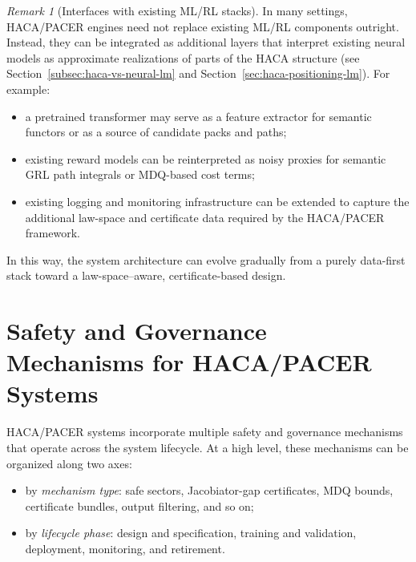 \documentclass[11pt]{book}
\theoremstyle{plain}
\theoremstyle{definition}
\theoremstyle{remark}
\newtheorem{remark}[theorem]{Remark}
\begin{document}
\begin{remark}[Interfaces with existing ML/RL stacks]
\label{rem:interfaces-ml-rl-stacks}
In many settings, HACA/PACER engines need not replace existing ML/RL
components outright. Instead, they can be integrated as additional
layers that interpret existing neural models as approximate realizations
of parts of the HACA structure (see
Section~\ref{subsec:haca-vs-neural-lm} and
Section~\ref{sec:haca-positioning-lm}). For example:
\begin{itemize}
  \item a pretrained transformer may serve as a feature extractor for
        semantic functors or as a source of candidate packs and paths;
  \item existing reward models can be reinterpreted as noisy proxies
        for semantic GRL path integrals or MDQ-based cost terms;
  \item existing logging and monitoring infrastructure can be extended
        to capture the additional law-space and certificate data
        required by the HACA/PACER framework.
\end{itemize}
In this way, the system architecture can evolve gradually from a purely
data-first stack toward a law-space–aware, certificate-based design.
\end{remark}



\section[Safety and Governance Mechanisms for HACA/PACER Systems]{Safety and Governance Mechanisms for HACA/PACER Systems}


HACA/PACER systems incorporate multiple safety and governance mechanisms
that operate across the system lifecycle. At a high level, these
mechanisms can be organized along two axes:
\begin{itemize}
  \item by \emph{mechanism type}: safe sectors, Jacobiator-gap
        certificates, MDQ bounds, certificate bundles, output
        filtering, and so on;
  \item by \emph{lifecycle phase}: design and specification, training
        and validation, deployment, monitoring, and retirement.
\end{itemize}
\end{document}
